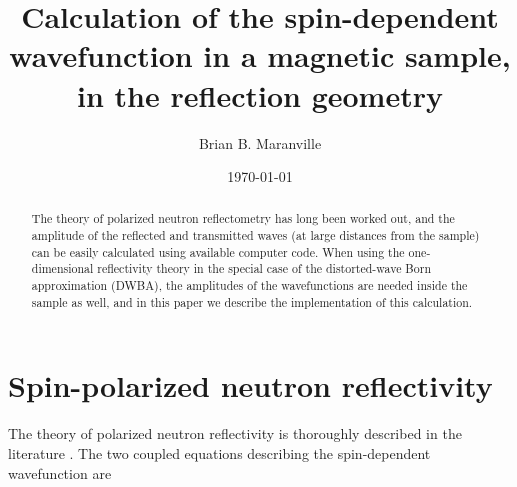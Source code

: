 \documentclass[%
 reprint,
 amsmath,
 amssymb,
 aps,
 prl,
 lengthcheck,%
]{revtex4-1}
\begin{document}

\title{Calculation of the spin-dependent wavefunction in a magnetic sample, in the reflection geometry}%

\author{Brian B. Maranville}
%

\date{\today}%

\begin{abstract}
The theory of polarized neutron reflectometry has long been worked out, and the 
amplitude of the reflected and transmitted waves (at large distances from the 
sample) can be easily calculated using
available computer code.  When using the one-dimensional reflectivity theory in
the special case of the distorted-wave Born approximation (DWBA), the amplitudes
of the wavefunctions are needed inside the sample as well, and in this paper
we describe the implementation of this calculation.
\end{abstract}

\maketitle

\section{Spin-polarized neutron reflectivity}
The theory of polarized neutron reflectivity is thoroughly described in the 
literature \cite{PNRMajkrzakChapter}.  The two coupled equations describing the
spin-dependent wavefunction are 
\end{document}
